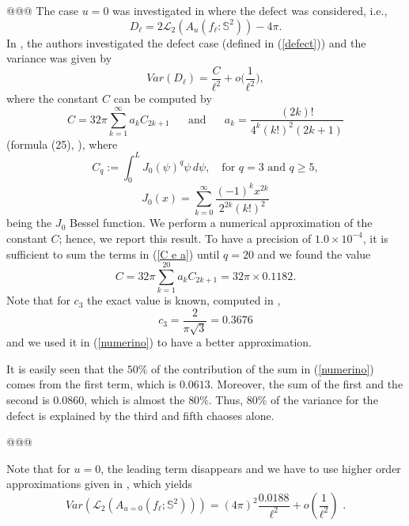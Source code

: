 \documentclass[aps,prd,showpacs,superscriptaddress,groupedaddress]{revtex4-1}  %
\begin{document}
@@@ The case $u=0$ was investigated in \cite{M e W 2011bis} where the defect was considered, i.e., $$D_\ell=2 \mathcal{L}_2(A_u(f_\ell: \mathbb{S}^2))-4\pi.$$
In \cite{M e W 2011bis}, the authors investigated the defect case (defined in (\ref{defect})) and the variance was given by 
\begin{equation}\label{defect var}
Var(D_\ell)=\dfrac{C}{\ell^2}+o\bigg(\dfrac{1}{\ell^2}\bigg),
\end{equation} 
where the constant $C$ can be computed by
\begin{equation}\label{C e a}
C=32\pi \sum_{k=1}^{\infty} a_k C_{2k+1} \mbox{ } \mbox{ } \mbox{ and } \mbox{ } \mbox{ } a_k=\dfrac{(2k)!}{4^k (k!)^2(2k+1)}
\end{equation}
(formula (25), \cite{MW2012}), where
$$C_q:=  \int_{0}^{L} J_0(\psi)^q \psi \,d\psi, \mbox{  } \mbox{ for } q=3 \mbox{ and }q\geq 5,$$
\begin{equation}\label{J0}
 J_0(x)=\sum_{k=0}^{\infty} \dfrac{(-1)^kx^{2k}}{2^{2k}(k!)^2}
\end{equation} being the $J_0$ Bessel function.
We perform a numerical approximation of the constant $C$; hence, we report this result. To have a precision of $1.0\times10^{-4}$, it is sufficient to sum the terms in (\ref{C e a}) until $q=20$ and we found the value
\begin{equation}\label{numerino}
C=32\pi \sum_{k=1}^{20} a_k C_{2k+1}= 32\pi \times 0.1182.
\end{equation}
Note that for $c_3$ the exact value is known, computed in \cite{}, $$c_3=\dfrac{2}{\pi \sqrt{3}}=0.3676$$ and we used it in (\ref{numerino}) to have a better approximation.


\begin{remark}
	It is easily seen that the $50\%$ of the contribution of the sum in (\ref{numerino}) comes from the first term, which is $0.0613$. Moreover, the sum of the first and the second is $0.0860$, which is almost the $80\%$. Thus, $80\%$ of the variance for the defect is explained by the third and fifth chaoses alone.
\end{remark}

@@@

Note that for $u=0$, the leading term disappears and we have to use higher order approximations given in \cite{}, which yields 
\begin{equation}
    Var\left( \mathcal{L}_{2}(A_{u=0}(f_{\ell };\mathbb{S}^{2})) \right) =  (4\pi)^2 \frac{0.0188}{\ell^2} + o(\frac{1}{\ell^2}) \text{ .}
\end{equation}
\end{document}

